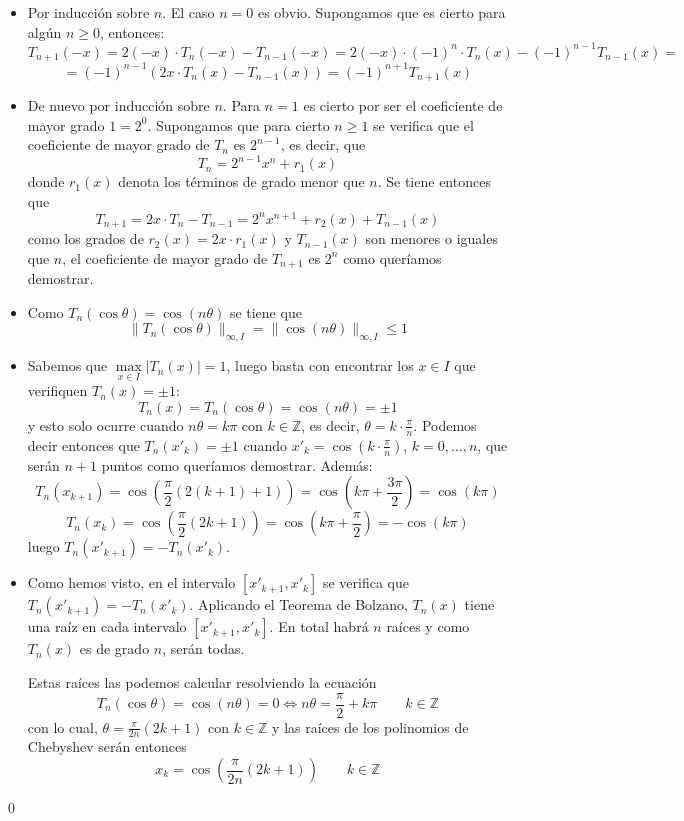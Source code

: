         \begin{dem}\:\vspace{-5mm}
        \begin{itemize}
            \item[a)] Por inducción sobre $n$. El caso $n=0$ es obvio. Supongamos que es cierto para algún $n\geq0$, entonces:
            $$T_{n+1}(-x)=2(-x)\cdot T_n(-x)-T_{n-1}(-x)=2(-x)\cdot (-1)^n\cdot T_n(x)-(-1)^{n-1}T_{n-1}(x)=$$
            $$=(-1)^{n-1}(2x\cdot T_n(x)-T_{n-1}(x))=(-1)^{n+1}T_{n+1}(x)$$
            \item[b)] De nuevo por inducción sobre $n$. Para $n=1$ es cierto por ser el coeficiente de mayor grado $1=2^0$. Supongamos que para cierto $n\geq 1$ se verifica que el coeficiente de mayor grado de $T_n$ es $2^{n-1}$, es decir, que $$T_{n}=2^{n-1}x^n+r_1(x)$$
            donde $r_1(x)$ denota los términos de grado menor que $n$. Se tiene entonces que
            $$T_{n+1}=2x\cdot T_n-T_{n-1}=2^nx^{n+1}+r_2(x)+T_{n-1}(x)$$
            como los grados de $r_2(x)=2x\cdot r_1(x)$ y $T_{n-1}(x)$ son menores o iguales que $n$, el coeficiente de mayor grado de $T_{n+1}$ es $2^n$ como queríamos demostrar.
            \item[c)] Como $T_n(\cos\theta)=\cos(n\theta)$ se tiene que
            $$\|T_n(\cos\theta)\|_{\infty,I}=\|\cos(n\theta)\|_{\infty,I}\leq 1$$
            \item[d)] Sabemos que $\underset{x\in I}{\max}|T_n(x)|=1$, luego basta con encontrar los $x\in I$ que verifiquen $T_n(x)=\pm 1$:
            $$T_n(x)=T_n(\cos\theta)=\cos(n\theta)=\pm1$$
            y esto solo ocurre cuando $n\theta=k\pi$ con $k\in\mathbb{Z}$, es decir, $\theta=k\cdot\frac{\pi}{n}$. Podemos decir entonces que $T_n(x'_k)=\pm 1$ cuando $x'_k=\cos\left(k\cdot\frac{\pi}{n}\right)$, $k=0,\ldots,n$, que serán $n+1$ puntos como queríamos demostrar. Además:
            $$T_n(x_{k+1})=\cos\left(\frac{\pi}{2}(2(k+1)+1)\right)=\cos\left(k\pi +\frac{3\pi}{2}\right)=\cos(k\pi)$$
            $$T_n(x_k)=\cos\left(\frac{\pi}{2}(2k+1)\right)=\cos\left(k\pi+\frac{\pi}{2}\right)=-\cos(k\pi)$$
            luego $T_n(x'_{k+1})=-T_n(x'_k)$.
            \item[e)] Como hemos visto, en el intervalo $[x'_{k+1},x'_{k}]$ se verifica que $T_n(x'_{k+1})=-T_n(x'_k)$. Aplicando el Teorema de Bolzano, $T_n(x)$ tiene una raíz en cada intervalo $[x'_{k+1},x'_{k}]$. En total habrá $n$ raíces y como $T_n(x)$ es de grado $n$, serán todas.

            Estas raíces las podemos calcular resolviendo la ecuación
            $$T_n(\cos\theta)=\cos(n\theta)=0\Longleftrightarrow n\theta=\frac{\pi}{2}+k\pi\qquad k\in\mathbb{Z}$$
            con lo cual, $\theta=\frac{\pi}{2n}(2k+1)$ con $k\in\mathbb{Z}$ y las raíces de los polinomios de Chebyshev serán entonces
            $$x_k=\cos\left(\frac{\pi}{2n}(2k+1)\right)\qquad k\in \mathbb{Z}$$
        \end{itemize}
        \qed\end{dem}
